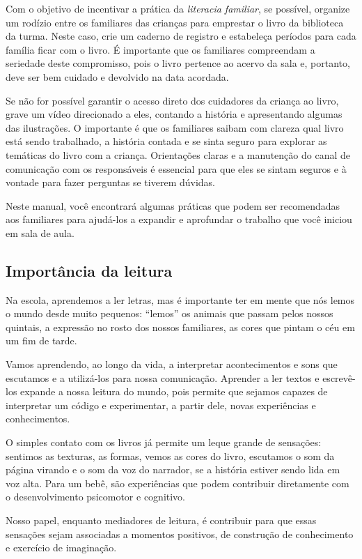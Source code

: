 \documentclass[11pt]{extarticle}
\begin{document}
\begin{enumerate}
Com o objetivo de incentivar 
a prática da \textit{literacia familiar}, se possível, organize um rodízio entre os familiares 
das crianças para emprestar o livro da biblioteca da turma. Neste caso, crie um caderno 
de registro e estabeleça períodos para cada família ficar com o livro. É importante 
que os familiares compreendam a seriedade deste compromisso, pois o livro pertence 
ao acervo da sala e, portanto, deve ser bem cuidado e devolvido na data acordada. 

Se não for possível garantir o acesso direto dos cuidadores da criança ao livro, 
grave um vídeo direcionado a eles, contando a história e apresentando algumas 
das ilustrações. O importante é que os familiares saibam com clareza qual livro 
está sendo trabalhado, a história contada e se sinta seguro para explorar as temáticas 
do livro com a criança. Orientações claras e a manutenção do canal de comunicação com 
os responsáveis é essencial para que eles se sintam seguros e à vontade para fazer perguntas 
se tiverem dúvidas. 

Neste manual, você encontrará algumas práticas que podem ser 
recomendadas aos familiares para ajudá-los a expandir e aprofundar o trabalho 
que você iniciou em sala de aula.


\subsection{Importância da leitura}
Na escola, aprendemos a ler letras, mas é importante ter em mente que nós 
lemos o mundo desde muito pequenos: “lemos” os animais que passam pelos nossos 
quintais, a expressão no rosto dos nossos familiares, as cores que pintam o céu 
em um fim de tarde. 

Vamos aprendendo, ao longo da vida, a interpretar acontecimentos 
e sons que escutamos e a utilizá-los para nossa comunicação. Aprender a ler textos e 
escrevê-los expande a nossa leitura do mundo, pois permite que sejamos capazes de 
interpretar um código e experimentar, a partir dele, novas experiências e conhecimentos. 

O simples contato com os livros já permite um leque grande de sensações: 
sentimos as texturas, as formas, vemos as cores do livro, escutamos o som da página 
virando e o som da voz do narrador, se a história estiver sendo lida em voz alta. Para um 
bebê, são experiências que podem contribuir diretamente com o desenvolvimento psicomotor 
e cognitivo. 

Nosso papel, enquanto mediadores de leitura, é contribuir para que essas 
sensações sejam associadas a momentos positivos, de construção de 
conhecimento e exercício de imaginação. 


\end{enumerate}
\end{document}
